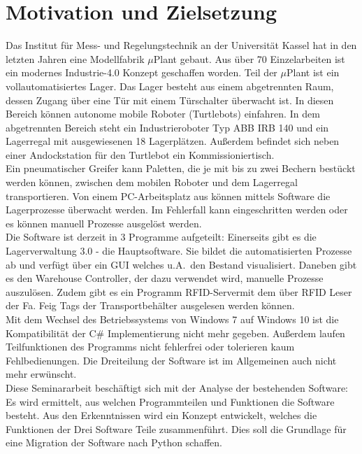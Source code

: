 
\chapter{Motivation und Zielsetzung}

    Das Institut für Mess- und Regelungstechnik an der Universität Kassel hat in den letzten Jahren eine Modellfabrik $\mu$Plant gebaut.
    Aus über 70 Einzelarbeiten ist ein modernes Industrie-4.0 Konzept geschaffen worden.
    Teil der $\mu$Plant ist ein vollautomatisiertes Lager.
    Das Lager besteht aus einem abgetrennten Raum, dessen Zugang über eine Tür mit einem Türschalter überwacht ist.
    In diesen Bereich können autonome mobile Roboter (Turtlebots) einfahren.
    In dem abgetrennten Bereich steht ein Industrieroboter Typ ABB IRB 140 und ein Lagerregal mit ausgewiesenen 18 Lagerplätzen.
    Außerdem befindet sich neben einer Andockstation für den Turtlebot ein Kommissioniertisch. \\

    Ein pneumatischer Greifer kann Paletten, die je mit bis zu zwei Bechern bestückt werden können,
    zwischen dem mobilen Roboter und dem Lagerregal transportieren.
    Von einem PC-Arbeitsplatz aus können mittels Software die Lagerprozesse überwacht werden.
    Im Fehlerfall kann eingeschritten werden oder es können manuell Prozesse ausgelöst werden.\\

    Die Software ist derzeit in 3 Programme aufgeteilt: Einerseits gibt es die Lagerverwaltung 3.0 - die Hauptsoftware.
    Sie bildet die automatisierten Prozesse ab und verfügt über ein GUI welches u.A.\ den Bestand visualisiert.
    Daneben gibt es den Warehouse Controller, der dazu verwendet wird, manuelle Prozesse auszulösen.
    Zudem gibt es ein Programm \glqq RFID-Server\grqq mit dem über RFID Leser der Fa. Feig Tags der Transportbehälter
    ausgelesen werden können.
    \\
    Mit dem Wechsel des Betriebssystems von Windows 7 auf Windows 10 ist die Kompatibilität der C\# Implementierung
    nicht mehr gegeben.
    Außerdem laufen Teilfunktionen des Programms nicht fehlerfrei oder tolerieren kaum Fehlbedienungen.
    Die Dreiteilung der Software ist im Allgemeinen auch nicht mehr erwünscht. \\

    Diese Seminararbeit beschäftigt sich mit der Analyse der bestehenden Software:
    Es wird ermittelt, aus welchen Programmteilen und Funktionen die Software besteht.
    Aus den Erkenntnissen wird ein Konzept entwickelt, welches die Funktionen der Drei Software Teile zusammenführt.
    Dies soll die Grundlage für eine Migration der Software nach Python schaffen.

